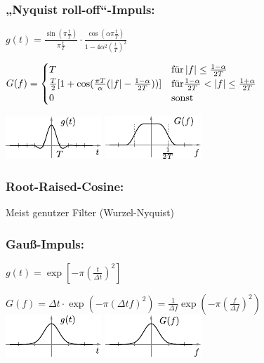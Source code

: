 \documentclass[fs, footer]{latex4ei}
\begin{document}
\begin{multicols*}{4}
{		\subsubsection{„Nyquist roll-off“-Impuls:}

		$g(t) = \frac{\sin (\pi \frac t  T)}{\pi \frac t  T} \cdot \frac{\cos (\alpha \pi \frac t T )}{1 - 4 \alpha^2 (\frac t T )^2}$

		$G(f) = \begin{cases}
			T &\text{für} \left\vert f\right\vert \le \frac{1 - \alpha}{2T} \\
		\frac{T}{2} [ 1 + \cos ( \frac{\pi T}{\alpha} ( \left\vert f\right\vert - \frac{1 - \alpha}{2T}) ) ] &\text{für} \frac{1 - \alpha}{2T} < \left\vert f\right\vert \le \frac{1 + \alpha}{2T} \\
			0 & \text{sonst} 
		\end{cases}$

		\includegraphics{./img/FT/nyquist_t.pdf} \hfill \includegraphics{./img/FT/nyquist_f.pdf}

		\subsubsection{Root-Raised-Cosine:}
		Meist genutzer Filter (Wurzel-Nyquist)
		\subsubsection{Gauß-Impuls:}
		$g(t) = \exp\left[ -\pi\left( \frac{t}{\Delta t} \right)^2 \right]$

		$G(f) = \Delta t \cdot \exp \left(  - \pi \left(\Delta t f \right)^2 \right) = \frac{1}{\Delta f} \exp \left(- \pi \left( \frac{f}{\Delta f} \right)^2 \right)$
		\includegraphics{./img/FT/gauss_t.pdf} \hfill \includegraphics{./img/FT/gauss_f.pdf}
}


\end{multicols*}
\end{document}
